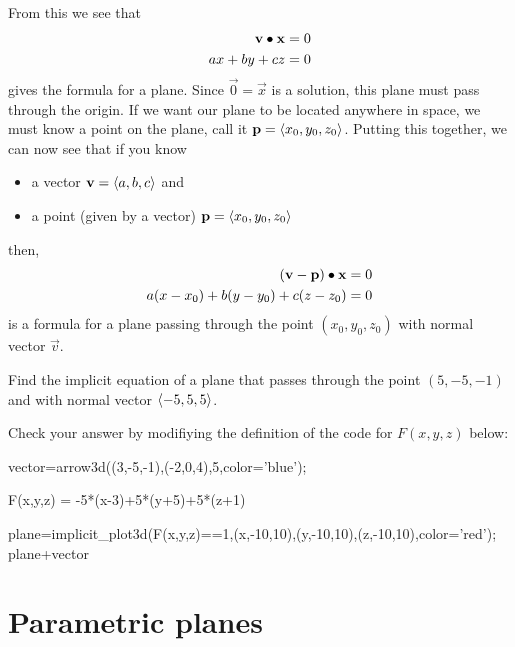 \documentclass{ximera}
\begin{document}
From this we see that
\begin{align*}
\mathbf{v}\bullet\mathbf{x} &=0\\
ax+by+cz &= 0
\end{align*}
gives the formula for a plane. Since $\vec{0} = \vec{x}$ is a
solution, this plane must pass through the origin. If we want our
plane to be located anywhere in space, we must know a point on the
plane, call it $\mathbf{p}=\left\langle x_0,y_0,z_0\right\rangle$. Putting this together, we can
now see that if you know
\begin{itemize}
  \item a vector $\mathbf{v} = \left\langle a,b,c\right\rangle$ and
  \item a point (given by a vector) $\mathbf{p} = \left\langle x_0,y_0,z_0\right\rangle$
\end{itemize}
then,
\begin{align*}
  (\mathbf{v}-\mathbf{p})\bullet \mathbf{x} &= 0\\
  a(x-x_0) + b(y-y_0) + c(z-z_0) &= 0
\end{align*}
is a formula for a plane passing through the point $(x_0,y_0,z_0)$
with normal vector $\vec{v}$.

\begin{question}
  Find the implicit equation of a plane that passes through the point
  $(5,-5,-1)$ and with normal vector $\left\langle -5,5,5\right\rangle$.
  \begin{onlineOnly}
    Check your answer by modifiying the definition of the \sage code
    for $F(x,y,z)$ below:
  \begin{sageCell}
vector=arrow3d((3,-5,-1),(-2,0,4),5,color='blue');

F(x,y,z) = -5*(x-3)+5*(y+5)+5*(z+1)

plane=implicit_plot3d(F(x,y,z)==1,(x,-10,10),(y,-10,10),(z,-10,10),color='red');
plane+vector
  \end{sageCell}
  \end{onlineOnly}
\end{question}



\section{Parametric planes}
\end{document}
